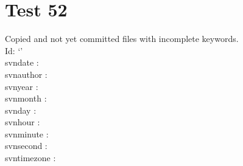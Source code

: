 \documentclass[12pt]{report}
\begin{document}
\chapter{Test 52}
Copied and not yet committed files with incomplete keywords.\\

\noindent
  Id: `\texttt{\svnkwId}' \\
 svndate : \svnfiledate  \\
 svnauthor : \svnfileauthor  \\
 svnyear : \svnfileyear  \\
 svnmonth : \svnfilemonth  \\
 svnday : \svnfileday  \\
 svnhour : \svnfilehour  \\
 svnminute : \svnfileminute  \\
 svnsecond : \svnfilesecond  \\
 svntimezone : \svnfiletimezone  \\
\end{document}
